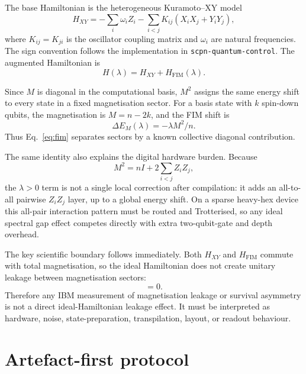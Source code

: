 \documentclass[preprint,aps,physrev,superscriptaddress,floatfix,longbibliography]{revtex4-2}
\begin{document}
The base Hamiltonian is the heterogeneous Kuramoto--XY model
%
\begin{equation}
  H_{XY} =
  -\sum_i \omega_i Z_i
  -\sum_{i<j} K_{ij}(X_iX_j+Y_iY_j),
  \label{eq:hxy}
\end{equation}
%
where $K_{ij}=K_{ji}$ is the oscillator coupling matrix and $\omega_i$ are
natural frequencies. The sign convention follows the implementation in
\texttt{scpn-quantum-control}. The augmented Hamiltonian is
%
\begin{equation}
  H(\lambda)=H_{XY}+H_{\mathrm{FIM}}(\lambda).
  \label{eq:total}
\end{equation}

Since $M$ is diagonal in the computational basis, $M^2$ assigns the same
energy shift to every state in a fixed magnetisation sector. For a basis state
with $k$ spin-down qubits, the magnetisation is
$M=n-2k$, and the FIM shift is
%
\begin{equation}
  \Delta E_M(\lambda)=-\lambda M^2/n.
  \label{eq:sector_shift}
\end{equation}
%
Thus Eq.~\eqref{eq:fim} separates sectors by a known collective diagonal
contribution.

The same identity also explains the digital hardware burden. Because
%
\begin{equation}
  M^2 = nI + 2\sum_{i<j} Z_iZ_j,
  \label{eq:m2_pairwise}
\end{equation}
%
the $\lambda>0$ term is not a single local correction after compilation: it
adds an all-to-all pairwise $Z_iZ_j$ layer, up to a global energy shift. On a
sparse heavy-hex device this all-pair interaction pattern must be routed and
Trotterised, so any ideal spectral gap effect competes directly with extra
two-qubit-gate and depth overhead.

The key scientific boundary follows immediately. Both $H_{XY}$ and
$H_{\mathrm{FIM}}$ commute with total magnetisation, so the ideal Hamiltonian
does not create unitary leakage between magnetisation sectors:
%
\begin{equation}
  [H(\lambda),M]=0.
\end{equation}
%
Therefore any IBM measurement of magnetisation leakage or survival asymmetry is
not a direct ideal-Hamiltonian leakage effect. It must be interpreted as
hardware, noise, state-preparation, transpilation, layout, or readout behaviour.

\section{Artefact-first protocol}
\end{document}
